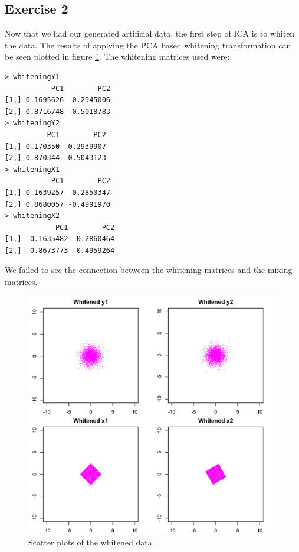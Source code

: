 \documentclass{article}
\begin{document}
\subsection{Exercise 2}
Now that we had our generated artificial data, the first step of ICA
is to whiten the data. The results of applying the PCA based whitening
transformation can be seen plotted in figure \ref{fig:scatterWhiteE22}.
The whitening matrices used were:
\begin{verbatim}
> whiteningY1
           PC1        PC2
[1,] 0.1695626  0.2945006
[2,] 0.8716748 -0.5018783
> whiteningY2
          PC1        PC2
[1,] 0.170350  0.2939907
[2,] 0.870344 -0.5043123
> whiteningX1
           PC1        PC2
[1,] 0.1639257  0.2850347
[2,] 0.8680057 -0.4991970
> whiteningX2
            PC1        PC2
[1,] -0.1635482 -0.2860464
[2,] -0.8673773  0.4959264
\end{verbatim}
We failed to see the connection between the whitening matrices and the
mixing matrices.




\begin{figure}\centering
	\includegraphics[totalheight=0.5\textheight]{scatterPlotOfWhitenedE22.pdf}
	\caption{Scatter plots of the whitened data.} \label{fig:scatterWhiteE22}
\end{figure}
\end{document}
